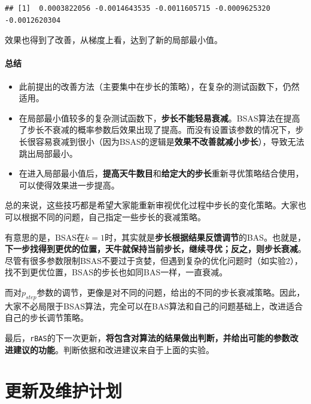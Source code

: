 \documentclass[]{ctexbook}
\newenvironment{Shaded}{\begin{snugshade}}{\end{snugshade}}
\newcommand{\KeywordTok}[1]{\textcolor[rgb]{0.13,0.29,0.53}{\textbf{#1}}}
\newcommand{\OperatorTok}[1]{\textcolor[rgb]{0.81,0.36,0.00}{\textbf{#1}}}
\newcommand{\NormalTok}[1]{#1}
\begin{document}
\begin{Shaded}
\end{Shaded}

\begin{verbatim}
## [1]  0.0003822056 -0.0014643535 -0.0011605715 -0.0009625320 -0.0012620304
\end{verbatim}

效果也得到了改善，从梯度上看，达到了新的局部最小值。

\subsubsection{总结}\label{-4}

\begin{itemize}
\item
  此前提出的改善方法（主要集中在步长的策略），在复杂的测试函数下，仍然适用。
\item
  在局部最小值较多的复杂测试函数下，\textbf{步长不能轻易衰减}。BSAS算法在提高了步长不衰减的概率参数后效果出现了提高。而没有设置该参数的情况下，步长很容易衰减到很小（因为BSAS的逻辑是\textbf{效果不改善就减小步长}），导致无法跳出局部最小。
\item
  在进入局部最小值后，\textbf{提高天牛数目}和\textbf{给定大的步长}重新寻优策略结合使用，可以使得效果进一步提高。
\end{itemize}

总的来说，这些技巧都是希望大家能重新审视优化过程中步长的变化策略。大家也可以根据不同的问题，自己指定一些步长的衰减策略。

有意思的是，BSAS在\(k=1\)时，其实就是\textbf{步长根据结果反馈调节}的BAS。也就是，\textbf{下一步找得到更优的位置，天牛就保持当前步长，继续寻优；反之，则步长衰减}。尽管有很多参数限制BSAS不要过于贪婪，但遇到复杂的优化问题时（如实验2），找不到更优位置，BSAS的步长也如同BAS一样，一直衰减。

而对\(p_{step}\)参数的调节，更像是对不同的问题，给出的不同的步长衰减策略。因此，大家不必局限于BSAS算法，完全可以在BAS算法和自己的问题基础上，改进适合自己的步长调节策略。

最后，\texttt{rBAS}的下一次更新，\textbf{将包含对算法的结果做出判断，并给出可能的参数改进建议的功能}。判断依据和改进建议来自于上面的实验。

\chapter{更新及维护计划}\label{updates}
\end{document}
